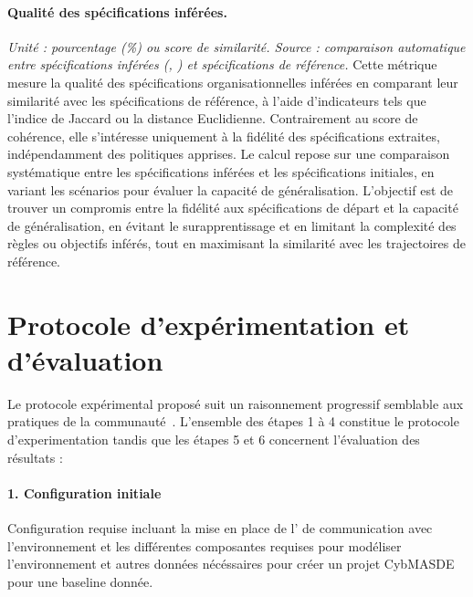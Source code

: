 \paragraph{Qualité des spécifications inférées.}
\textit{Unité : pourcentage (\%) ou score de similarité. Source : comparaison automatique entre spécifications inférées (, ) et spécifications de référence.}
Cette métrique mesure la qualité des spécifications organisationnelles inférées en comparant leur similarité avec les spécifications de référence, à l’aide d’indicateurs tels que l’indice de Jaccard ou la distance Euclidienne. Contrairement au score de cohérence, elle s’intéresse uniquement à la fidélité des spécifications extraites, indépendamment des politiques apprises. Le calcul repose sur une comparaison systématique entre les spécifications inférées et les spécifications initiales, en variant les scénarios pour évaluer la capacité de généralisation. L’objectif est de trouver un compromis entre la fidélité aux spécifications de départ et la capacité de généralisation, en évitant le surapprentissage et en limitant la complexité des règles ou objectifs inférés, tout en maximisant la similarité avec les trajectoires de référence.

\section{Protocole d'expérimentation et d'évaluation}\label{sec:protocole_experimental}

Le protocole expérimental proposé suit un raisonnement progressif semblable aux pratiques de la communauté~\cite{papoudakis2021agent}.
L'ensemble des étapes 1 à 4 constitue le protocole d'experimentation tandis que les étapes 5 et 6 concernent l'évaluation des résultats :

\paragraph{1. Configuration initiale}
Configuration requise incluant la mise en place de l’  de communication avec l'environnement et les différentes composantes requises pour modéliser l'environnement et autres données nécéssaires pour créer un projet CybMASDE pour une baseline donnée.

